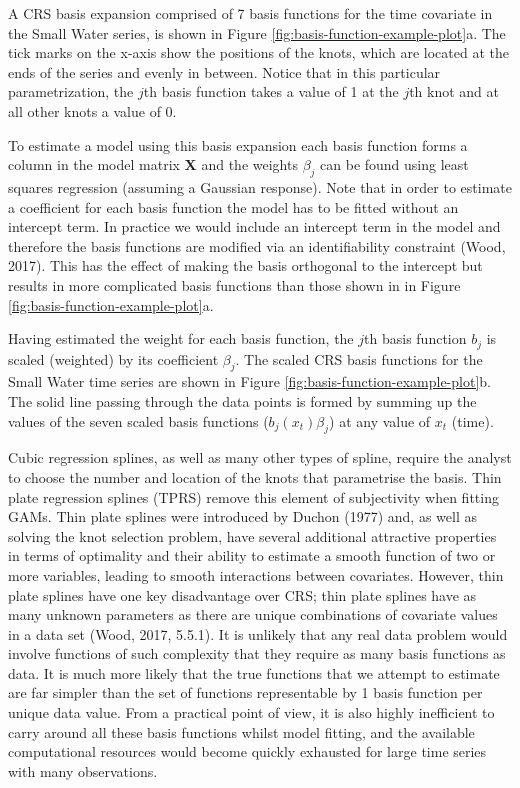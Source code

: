 \documentclass[12pt,]{article}
\begin{document}
A CRS basis expansion comprised of 7 basis functions for the time
covariate in the Small Water series, is shown in Figure
\ref{fig:basis-function-example-plot}a. The tick marks on the x-axis
show the positions of the knots, which are located at the ends of the
series and evenly in between. Notice that in this particular
parametrization, the \(j\)th basis function takes a value of 1 at the
\(j\)th knot and at all other knots a value of 0.

To estimate a model using this basis expansion each basis function forms
a column in the model matrix \textbf{X} and the weights \(\beta_j\) can
be found using least squares regression (assuming a Gaussian response).
Note that in order to estimate a coefficient for each basis function the
model has to be fitted without an intercept term. In practice we would
include an intercept term in the model and therefore the basis functions
are modified via an identifiability constraint (Wood, 2017). This has
the effect of making the basis orthogonal to the intercept but results
in more complicated basis functions than those shown in in Figure
\ref{fig:basis-function-example-plot}a.

Having estimated the weight for each basis function, the \(j\)th basis
function \(b_j\) is scaled (weighted) by its coefficient \(\beta_j\).
The scaled CRS basis functions for the Small Water time series are shown
in Figure \ref{fig:basis-function-example-plot}b. The solid line passing
through the data points is formed by summing up the values of the seven
scaled basis functions (\(b_j(x_t) \beta_j\)) at any value of \(x_t\)
(time).

Cubic regression splines, as well as many other types of spline, require
the analyst to choose the number and location of the knots that
parametrise the basis. Thin plate regression splines (TPRS) remove this
element of subjectivity when fitting GAMs. Thin plate splines were
introduced by Duchon (1977) and, as well as solving the knot selection
problem, have several additional attractive properties in terms of
optimality and their ability to estimate a smooth function of two or
more variables, leading to smooth interactions between covariates.
However, thin plate splines have one key disadvantage over CRS; thin
plate splines have as many unknown parameters as there are unique
combinations of covariate values in a data set (Wood, 2017, 5.5.1). It
is unlikely that any real data problem would involve functions of such
complexity that they require as many basis functions as data. It is much
more likely that the true functions that we attempt to estimate are far
simpler than the set of functions representable by 1 basis function per
unique data value. From a practical point of view, it is also highly
inefficient to carry around all these basis functions whilst model
fitting, and the available computational resources would become quickly
exhausted for large time series with many observations.
\end{document}
